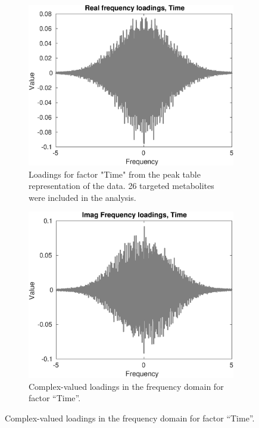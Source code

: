 \documentclass[preprint,12pt]{elsarticle}
\providecommand{\DIFaddbeginFL}{} %
\providecommand{\DIFaddendFL}{} %
\providecommand{\DIFdelbeginFL}{} %
\providecommand{\DIFdelendFL}{} %
\begin{document}
\begin{figure}[hbtp!]
    \vfill

    \begin{subfigure}[b]{0.45\textwidth}
        \centering
        \DIFdelbeginFL %
\DIFdelendFL \DIFaddbeginFL \includegraphics[width=\textwidth]{freq_loads_time_real.eps}
        \DIFaddendFL \caption{Loadings for factor "Time" from the peak table representation of the data. 26 targeted metabolites were included in the analysis.}
        \label{fig:figure3}
    \end{subfigure}
    \hfill
    \begin{subfigure}[b]{0.45\textwidth}
        \centering
        \DIFdelbeginFL %
\DIFdelendFL \DIFaddbeginFL \includegraphics[width=\textwidth]{freq_loads_time_imag.eps}
        \DIFaddendFL \caption{Complex-valued loadings in the frequency domain for factor ``Time''.}
        \label{fig:figure4}
    \end{subfigure}
    \vfill


\end{figure}
\end{document}

